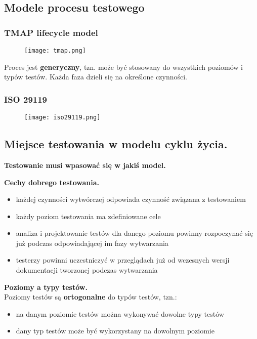 \documentclass[../main.tex]{subfiles}
\begin{document}
    \subsection{Modele procesu testowego}

    \subsubsection{TMAP lifecycle model}

    \begin{figure}[H]
        \texttt{[image: tmap.png]}
    \end{figure}

    Proces jest \textbf{generyczny}, tzn. może być stosowany do wszystkich
    poziomów i typów testów. Każda faza dzieli się na określone czynności.


    \subsubsection{ISO 29119}

    \begin{figure}[H]
        \texttt{[image: iso29119.png]}
    \end{figure}


    \subsection{Miejsce testowania w modelu cyklu życia.}

    \textbf{Testowanie musi wpasować się w jakiś model.}

    \textbf{Cechy dobrego testowania.}
    \begin{itemize}
        \item każdej czynności wytwórczej odpowiada czynność związana z testowaniem
        \item każdy poziom testowania ma zdefiniowane cele
        \item analiza i projektowanie testów dla danego poziomu powinny rozpoczynać się już podczas odpowiadającej
        im fazy wytwarzania
        \item testerzy powinni uczestniczyć w przeglądach już od wczesnych wersji dokumentacji tworzonej podczas wytwarzania
    \end{itemize}

    \textbf{Poziomy a typy testów.}\\
    Poziomy testów są \textbf{ortogonalne} do typów testów, tzn.:
    \begin{itemize}
        \item na danym poziomie testów można wykonywać dowolne typy testów
        \item dany typ testów może być wykorzystany na dowolnym poziomie
    \end{itemize}
\end{document}
